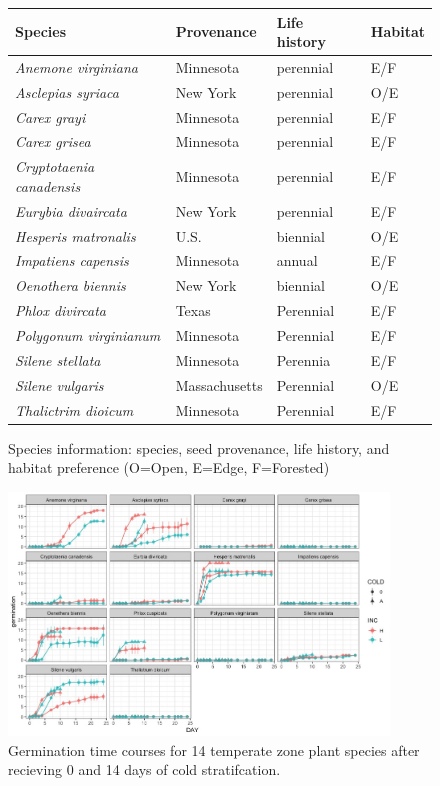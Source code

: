 \documentclass[12pt]{article}\usepackage[]{graphicx}\usepackage[]{color}
\begin{document}
\begin{figure}[here]
\begin{center}
\begin{tabular}{|l|l|l|l|}
\hline
\textbf{Species} & \textbf{Provenance} & \textbf{Life history} & \textbf{Habitat}\\
\hline
\textit{Anemone virginiana} & Minnesota & perennial & E/F\\
\hline
\textit{Asclepias syriaca} & New York & perennial & O/E \\
\hline
\textit{Carex grayi} & Minnesota & perennial & E/F\\
\hline
\textit{Carex grisea}& Minnesota & perennial & E/F\\
\hline
\textit{Cryptotaenia canadensis} & Minnesota & perennial & E/F\\
\hline
\textit{Eurybia divaircata} & New York & perennial & E/F\\
\hline
\textit{Hesperis matronalis} & U.S. & biennial & O/E\\
\hline
\textit{Impatiens capensis} & Minnesota & annual & E/F \\
\hline
\textit{Oenothera biennis} & New York & biennial & O/E \\
\hline
\textit{Phlox divircata} & Texas & Perennial & E/F\\
\hline
\textit{Polygonum virginianum} & Minnesota & Perennial & E/F\\
\hline
\textit{Silene stellata} & Minnesota & Perennia & E/F\\
\hline
\textit{Silene vulgaris} & Massachusetts & Perennial & O/E\\
\hline
\textit{Thalictrim dioicum} & Minnesota & Perennial & E/F\\
\hline
\end{tabular}
\caption{Species information: species, seed provenance, life history, and habitat preference (O=Open, E=Edge, F=Forested)}
\label{fig:Figure 5}
\end{center}
\end{figure}


\begin{figure}[here]
\begin{center}
\includegraphics[width=0.9\textwidth]{..//figures/time_course2_output.jpeg}
\caption{Germination time courses for 14 temperate zone plant species after recieving 0 and 14 days of cold stratifcation.}
\label{fig:Figure 6}
\end{center}
\end{figure}
\end{document}
